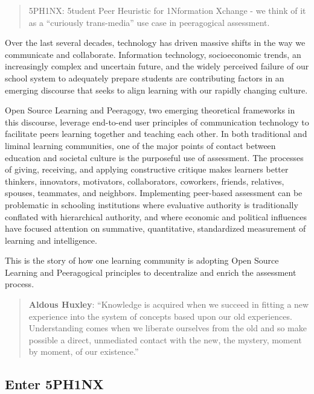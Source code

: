 \begin{quote}
5PH1NX: 5tudent Peer Heuristic for 1Nformation Xchange - we think of it
as a ``curiously trans-media'' use case in peeragogical assessment.
\end{quote}

Over the last several decades, technology has driven massive shifts in
the way we communicate and collaborate. Information technology,
socioeconomic trends, an increasingly complex and uncertain future, and
the widely perceived failure of our school system to adequately prepare
students are contributing factors in an emerging discourse that seeks to
align learning with our rapidly changing culture.

Open Source Learning and Peeragogy, two emerging theoretical frameworks
in this discourse, leverage end-to-end user principles of communication
technology to facilitate peers learning together and teaching each
other. In both traditional and liminal learning communities, one of the
major points of contact between education and societal culture is the
purposeful use of assessment. The processes of giving, receiving, and
applying constructive critique makes learners better thinkers,
innovators, motivators, collaborators, coworkers, friends, relatives,
spouses, teammates, and neighbors. Implementing peer-based assessment
can be problematic in schooling institutions where evaluative authority
is traditionally conflated with hierarchical authority, and where
economic and political influences have focused attention on summative,
quantitative, standardized measurement of learning and intelligence.

This is the story of how one learning community is adopting Open Source
Learning and Peeragogical principles to decentralize and enrich the
assessment process.

\begin{quote}
\textbf{Aldous Huxley}: ``Knowledge is acquired when we succeed in
fitting a new experience into the system of concepts based upon our old
experiences. Understanding comes when we liberate ourselves from the old
and so make possible a direct, unmediated contact with the new, the
mystery, moment by moment, of our existence.''
\end{quote}

\hypertarget{enter-5ph1nx}{%
\subsection{Enter 5PH1NX}\label{enter-5ph1nx}}

